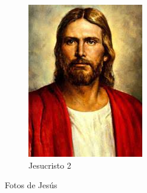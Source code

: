\documentclass{article}
\begin{document}
\begin{figure}
\begin{subfigure}{0.49\textwidth}
        \includegraphics[width=\textwidth, heigth=10cm]{descarga.jpeg}
        \caption{Jesucristo 2 }
        \label{fig_3}
    \end{subfigure}
    \caption{Fotos de Jesús}
    \label{fig_4}
\end{figure}



\end{document}
